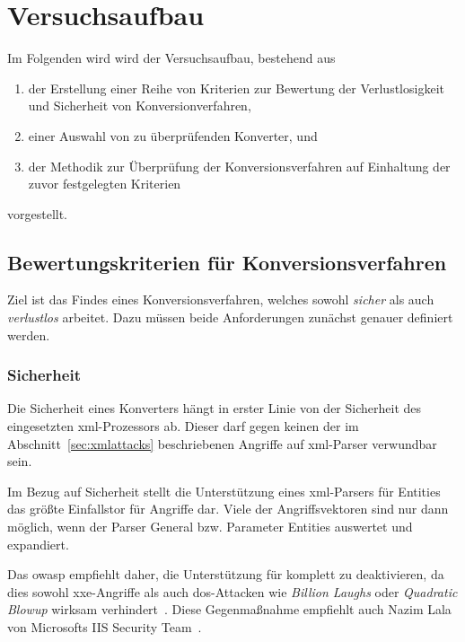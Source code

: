 \chapter{Versuchsaufbau}
\label{chap:impl}

Im Folgenden wird wird der Versuchsaufbau, bestehend aus
\begin{enumerate}
    \item{} der Erstellung einer Reihe von Kriterien zur Bewertung der Verlustlosigkeit  und Sicherheit von Konversionverfahren,
    \item{} einer Auswahl von zu überprüfenden Konverter, und
    \item{} der Methodik zur Überprüfung der Konversionsverfahren auf Einhaltung der zuvor festgelegten Kriterien
\end{enumerate}
vorgestellt.

\section{Bewertungskriterien für Konversionsverfahren}
\label{sec:criteria}

Ziel ist das Findes eines Konversionsverfahren, welches sowohl \emph{sicher} als auch \emph{verlustlos} arbeitet. Dazu müssen beide Anforderungen zunächst genauer definiert werden.

\subsection{Sicherheit}
\label{sec:criteria-security}

Die Sicherheit eines Konverters hängt in erster Linie von der Sicherheit des eingesetzten \acrshort{xml}-Prozessors ab. Dieser darf gegen keinen der im Abschnitt~\ref{sec:xmlattacks} beschriebenen Angriffe auf \acrshort{xml}-Parser verwundbar sein.

Im Bezug auf Sicherheit stellt die Unterstützung eines \acrshort{xml}-Parsers für Entities das größte Einfallstor für Angriffe dar. Viele der Angriffsvektoren sind nur dann möglich, wenn der Parser General bzw. Parameter Entities auswertet und expandiert.

Das \acrfull{owasp} empfiehlt daher, die Unterstützung für  komplett zu deaktivieren, da dies sowohl \acrshort{xxe}-Angriffe als auch \acrshort{dos}-Attacken wie \emph{Billion Laughs} oder \emph{Quadratic Blowup} wirksam verhindert~\cite[Abschn.~1.1]{owasp2017xxeprevention}. Diese Gegenmaßnahme empfiehlt auch Nazim Lala von Microsofts IIS Security Team~\cite{lala2013handlinguntrustedxml}.

